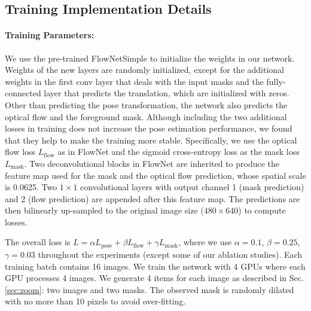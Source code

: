 \documentclass[twocolumn]{svjour3}
\begin{document}
\subsection{Training Implementation Details}
\label{sec.training_details}


\paragraph{Training Parameters:} 
We use the pre-trained FlowNetSimple \citep{dosovitskiy2015flownet} to initialize the weights in our network. Weights of the new layers are randomly initialized, except for the additional weights in the first conv layer that deals with the input masks and the fully-connected layer that predicts the translation, which are initialized with zeros. Other than predicting the pose transformation, the network also predicts the optical flow and the foreground mask. Although including the two additional losses in training does not increase the pose estimation performance, we found that they help to make the training more stable. Specifically, we use the optical flow loss $L_\text{flow}$ as in FlowNet \citep{dosovitskiy2015flownet} and the sigmoid cross-entropy loss as the mask loss $L_\text{mask}$. Two deconvolutional blocks in FlowNet are inherited to produce the feature map used for the mask and the optical flow prediction, whose spatial scale is 0.0625. Two $1\times 1$ convolutional layers with output channel 1 (mask prediction) and 2 (flow prediction) are appended after this feature map. The predictions are then bilinearly up-sampled to the original image size ($480\times 640$) to compute losses. 

The overall loss is $L = \alpha L_\text{pose} + \beta L_\text{flow} + \gamma L_\text{mask}$, where we use $\alpha = 0.1$, $\beta = 0.25$, $\gamma = 0.03$ throughout the experiments (except some of our ablation studies). Each training batch contains 16 images. We train the network with 4 GPUs where each GPU processes 4 images. We generate 4 items for each image as described in Sec. \ref{sec:zoom}: two images and two masks. The observed mask is randomly dilated with no more than 10 pixels to avoid over-fitting.
\end{document}
